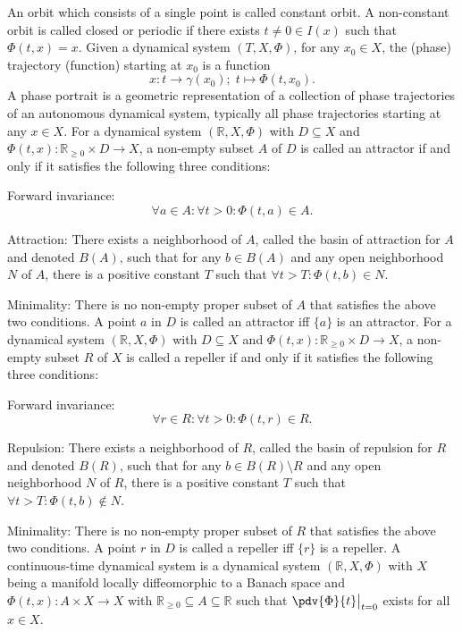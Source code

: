 \documentclass[a4paper,12pt]{report}
\begin{document}
An orbit which consists of a single point is called constant orbit. A non-constant orbit is called closed or periodic if there exists $t\neq 0\in I(x)$ such that $\Phi (t,x)=x$.
Given a dynamical system $(T, X, \Phi)$, for any $x_0\in X$, the (phase) trajectory (function) starting at $x_0$ is a function
\[x\colon t\to\gamma(x_0);\;t\mapsto\Phi(t,x_0).\]
A phase portrait is a geometric representation of a collection of phase trajectories of an autonomous dynamical system, typically all phase trajectories starting at any $x\in X$.
For a dynamical system $(\mathbb{R}, X, \Phi)$ with $D\subseteq X$ and $\Phi(t,x)\colon \mathbb{R}_{\geq 0}\times D\to X$, a non-empty subset $A$ of $D$ is called an attractor if and only if it satisfies the following three conditions:
\bit
\item Forward invariance:
    \[\forall a\in A\colon\forall t>0\colon\Phi(t,a)\in A.\]
\item Attraction: There exists a neighborhood of $A$, called the basin of attraction for $A$ and denoted $B(A)$, such that for any $b\in B(A)$ and any open neighborhood $N$ of $A$, there is a positive constant $T$ such that $\forall t>T\colon\Phi(t,b)\in N$.
\item Minimality: There is no non-empty proper subset of $A$ that satisfies the above two conditions.
\eit
A point $a$ in $D$ is called an attractor iff $\{a\}$ is an attractor.
For a dynamical system $(\mathbb{R}, X, \Phi)$ with $D\subseteq X$ and $\Phi(t,x)\colon \mathbb{R}_{\geq 0}\times D\to X$, a non-empty subset $R$ of $X$ is called a repeller if and only if it satisfies the following three conditions:
\bit
\item Forward invariance:
    \[\forall r\in R\colon\forall t>0\colon\Phi(t,r)\in R.\]
\item Repulsion: There exists a neighborhood of $R$, called the basin of repulsion for $R$ and denoted $B(R)$, such that for any $b\in B(R)\setminus R$ and any open neighborhood $N$ of $R$, there is a positive constant $T$ such that $\forall t>T\colon\Phi(t,b)\notin N$.
\item Minimality: There is no non-empty proper subset of $R$ that satisfies the above two conditions.
\eit
A point $r$ in $D$ is called a repeller iff $\{r\}$ is a repeller.
A continuous-time dynamical system is a dynamical system $(\mathbb{R}, X, \Phi)$ with $X$ being a manifold locally diffeomorphic to a Banach space and $\Phi(t,x)\colon A\times X\to X$ with $\mathbb{R}_{\geq 0}\subseteq A\subseteq\mathbb{R}$ such that $\pdv{\Phi}{t}\big\vert_{t=0}$ exists for all $x\in X$.
\end{document}
